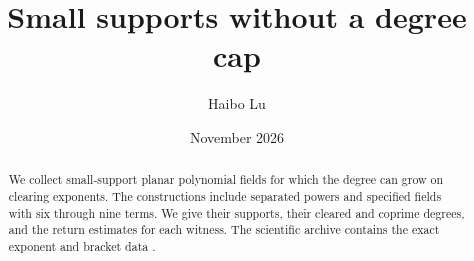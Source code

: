 
\renewcommand{\thesection}{U\arabic{section}}
\renewcommand{\thetable}{U\arabic{table}}
\setcounter{tocdepth}{1}
\title{Small supports without a degree cap}
\author{Haibo Lu}
\date{November 2026}

\maketitle
\begin{abstract}
We collect small-support planar polynomial fields for which the degree can grow on clearing exponents. The constructions include separated powers and specified fields with six through nine terms. We give their supports, their cleared and coprime degrees, and the return estimates for each witness. The scientific archive contains the exact exponent and bracket data \cite{LuReplay}.
\end{abstract}
\begingroup
\renewcommand{\numberline}[1]{\makebox[2.5em][l]{#1}}
\tableofcontents
\endgroup







\begingroup
\renewcommand{\thesubsection}{\thesection.\Alph{subsection}}

\par\endgroup




